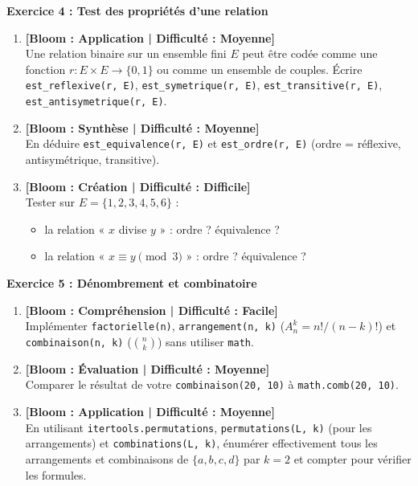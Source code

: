\vspace{0.3cm}

\noindent\textbf{Exercice 4 : Test des propriétés d'une relation}
\begin{enumerate}
    \item \textbf{[Bloom : Application | Difficulté : Moyenne]} \\
    Une relation binaire sur un ensemble fini $E$ peut être codée comme une fonction $r : E \times E \to \{0, 1\}$ ou comme un ensemble de couples. Écrire \texttt{est\_reflexive(r, E)}, \texttt{est\_symetrique(r, E)}, \texttt{est\_transitive(r, E)}, \texttt{est\_antisymetrique(r, E)}.
    \item \textbf{[Bloom : Synthèse | Difficulté : Moyenne]} \\
    En déduire \texttt{est\_equivalence(r, E)} et \texttt{est\_ordre(r, E)} (ordre = réflexive, antisymétrique, transitive).
    \item \textbf{[Bloom : Création | Difficulté : Difficile]} \\
    Tester sur $E = \{1, 2, 3, 4, 5, 6\}$ :
    \begin{itemize}
        \item la relation « $x$ divise $y$ » : ordre ? équivalence ?
        \item la relation « $x \equiv y \pmod{3}$ » : ordre ? équivalence ?
    \end{itemize}
\end{enumerate}

\vspace{0.3cm}

\noindent\textbf{Exercice 5 : Dénombrement et combinatoire}
\begin{enumerate}
    \item \textbf{[Bloom : Compréhension | Difficulté : Facile]} \\
    Implémenter \texttt{factorielle(n)}, \texttt{arrangement(n, k)} ($A_n^k = n!/(n-k)!$) et \texttt{combinaison(n, k)} ($\binom{n}{k}$) sans utiliser \texttt{math}.
    \item \textbf{[Bloom : Évaluation | Difficulté : Moyenne]} \\
    Comparer le résultat de votre \texttt{combinaison(20, 10)} à \texttt{math.comb(20, 10)}.
    \item \textbf{[Bloom : Application | Difficulté : Moyenne]} \\
    En utilisant \texttt{itertools.permutations}, \texttt{permutations(L, k)} (pour les arrangements) et \texttt{combinations(L, k)}, énumérer effectivement tous les arrangements et combinaisons de $\{a, b, c, d\}$ par $k = 2$ et compter pour vérifier les formules.
\end{enumerate}

